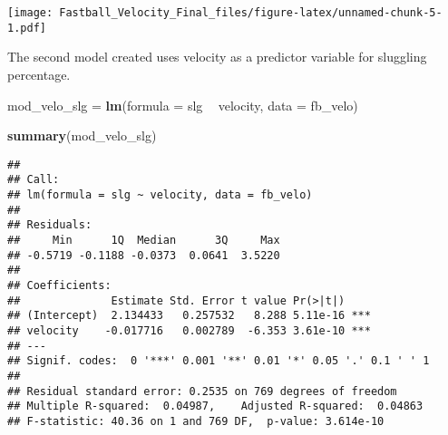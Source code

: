 \documentclass[]{article}
\newenvironment{Shaded}{\begin{snugshade}}{\end{snugshade}}
\newcommand{\KeywordTok}[1]{\textcolor[rgb]{0.13,0.29,0.53}{\textbf{#1}}}
\newcommand{\DataTypeTok}[1]{\textcolor[rgb]{0.13,0.29,0.53}{#1}}
\newcommand{\StringTok}[1]{\textcolor[rgb]{0.31,0.60,0.02}{#1}}
\newcommand{\OperatorTok}[1]{\textcolor[rgb]{0.81,0.36,0.00}{\textbf{#1}}}
\newcommand{\NormalTok}[1]{#1}
\begin{document}
\begin{Shaded}
\end{Shaded}

\texttt{[image: Fastball\_Velocity\_Final\_files/figure-latex/unnamed-chunk-5-1.pdf]}

The second model created uses velocity as a predictor variable for
sluggling percentage.

\begin{Shaded}
\begin{Highlighting}[]
\NormalTok{mod_velo_slg =}\StringTok{ }\KeywordTok{lm}\NormalTok{(}\DataTypeTok{formula =}\NormalTok{ slg }\OperatorTok{~}\StringTok{ }\NormalTok{velocity, }\DataTypeTok{data =}\NormalTok{ fb_velo)}
\end{Highlighting}
\end{Shaded}

\begin{Shaded}
\begin{Highlighting}[]
\KeywordTok{summary}\NormalTok{(mod_velo_slg)}
\end{Highlighting}
\end{Shaded}

\begin{verbatim}
## 
## Call:
## lm(formula = slg ~ velocity, data = fb_velo)
## 
## Residuals:
##     Min      1Q  Median      3Q     Max 
## -0.5719 -0.1188 -0.0373  0.0641  3.5220 
## 
## Coefficients:
##              Estimate Std. Error t value Pr(>|t|)    
## (Intercept)  2.134433   0.257532   8.288 5.11e-16 ***
## velocity    -0.017716   0.002789  -6.353 3.61e-10 ***
## ---
## Signif. codes:  0 '***' 0.001 '**' 0.01 '*' 0.05 '.' 0.1 ' ' 1
## 
## Residual standard error: 0.2535 on 769 degrees of freedom
## Multiple R-squared:  0.04987,    Adjusted R-squared:  0.04863 
## F-statistic: 40.36 on 1 and 769 DF,  p-value: 3.614e-10
\end{verbatim}

\begin{Shaded}
\end{Shaded}
\end{document}
